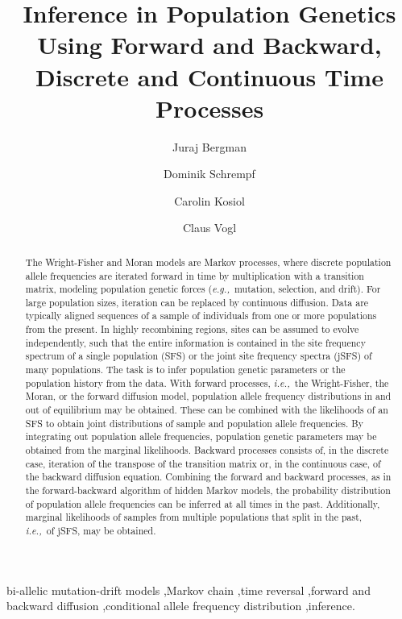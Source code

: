 \documentclass[preprint]{elsarticle}
\newcommand\eg{{\it e.g.,}}
\newcommand\ie{{\it i.e.,}}
\begin{document}
\begin{frontmatter}

\title{Inference in Population Genetics Using Forward and Backward, Discrete and Continuous Time Processes}

\author[address1,address2]{Juraj Bergman}
\author[address1,address2]{Dominik Schrempf}
\author[address1]{Carolin Kosiol}
\author[address3]{Claus Vogl}

\address[address1]{Institut f\"ur Populationsgenetik, Vetmeduni Vienna, Veterin\"arplatz 1, A-1210 Wien, Austria}
\address[address2]{Vienna Graduate School of Population Genetics, A-1210 Wien, Austria}
\address[address3]{Institut f\"ur Tierzucht und Genetik, Vetmeduni Vienna, Veterin\"arplatz 1, A-1210 Wien, Austria}

\begin{abstract}
The Wright-Fisher and Moran models are Markov processes, where discrete population allele frequencies are iterated forward in time by multiplication with a transition matrix, modeling population genetic forces (\eg\ mutation, selection, and drift). For large population sizes, iteration can be replaced by continuous diffusion. Data are typically aligned sequences of a sample of individuals from one or more populations from the present. In highly recombining regions, sites can be assumed to evolve independently, such that the entire information is contained in the site frequency spectrum of a single population (SFS) or the joint site frequency spectra (jSFS) of many populations. The task is to infer population genetic parameters or the population history from the data. With forward processes, \ie\ the Wright-Fisher, the Moran, or the forward diffusion model, population allele frequency distributions in and out of equilibrium may be obtained. These can be combined with the likelihoods of an SFS to obtain joint distributions of sample and population allele frequencies. By integrating out population allele frequencies, population genetic parameters may be obtained from the marginal likelihoods. Backward processes consists of, in the discrete case, iteration of the transpose of the transition matrix or, in the continuous case, of the backward diffusion equation. Combining the forward and backward processes, as in the forward-backward algorithm of hidden Markov models, the probability distribution of population allele frequencies can be inferred at all times in the past. Additionally, marginal likelihoods of samples from multiple populations that split in the past, \ie\ of jSFS, may be obtained.
\end{abstract}
\begin{keyword}
bi-allelic mutation-drift models \sep Markov chain \sep time reversal \sep forward and backward diffusion \sep conditional allele frequency distribution \sep inference.
\end{keyword}

\end{frontmatter}
\end{document}

